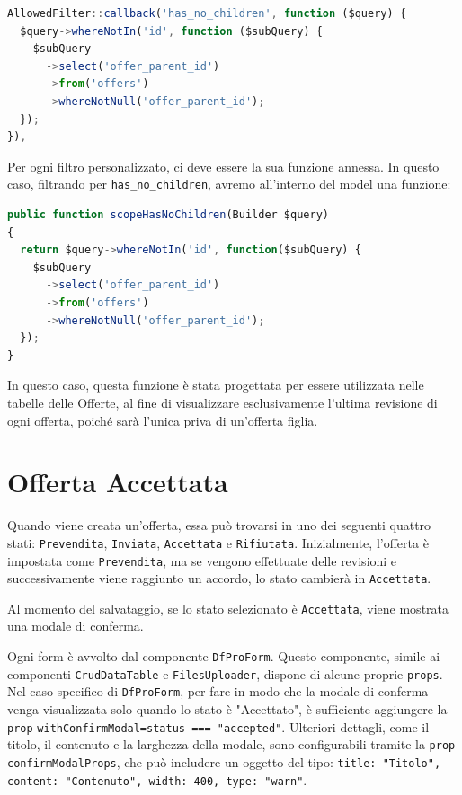 \begin{lstlisting}[language=JavaScript, numbers=none]
AllowedFilter::callback('has_no_children', function ($query) {
  $query->whereNotIn('id', function ($subQuery) {
    $subQuery
      ->select('offer_parent_id')
      ->from('offers')
      ->whereNotNull('offer_parent_id');
  });
}),
\end{lstlisting}

Per ogni filtro personalizzato, ci deve essere la sua funzione annessa. In questo caso, filtrando per \texttt{has\_no\_children}, avremo all'interno del model una funzione:

\begin{lstlisting}[language=JavaScript, numbers=none]
public function scopeHasNoChildren(Builder $query)
{
  return $query->whereNotIn('id', function($subQuery) {
    $subQuery
      ->select('offer_parent_id')
      ->from('offers')
      ->whereNotNull('offer_parent_id');
  });
}
\end{lstlisting}

In questo caso, questa funzione è stata progettata per essere utilizzata nelle tabelle delle Offerte, al fine di visualizzare esclusivamente l'ultima revisione di ogni offerta, poiché sarà l'unica priva di un'offerta figlia.

\section{Offerta Accettata}\label{sec:cap_sec_subsec_accepted_offer}
Quando viene creata un'offerta, essa può trovarsi in uno dei seguenti quattro stati: \texttt{Prevendita}, \texttt{Inviata}, \texttt{Accettata} e \texttt{Rifiutata}. Inizialmente, l'offerta è impostata come \texttt{Prevendita}, ma se vengono effettuate delle revisioni e successivamente viene raggiunto un accordo, lo stato cambierà in \texttt{Accettata}. 

Al momento del salvataggio, se lo stato selezionato è \texttt{Accettata}, viene mostrata una modale di conferma.

Ogni form è avvolto dal componente \texttt{DfProForm}. Questo componente, simile ai componenti \texttt{CrudDataTable} e \texttt{FilesUploader}, dispone di alcune proprie \texttt{props}. Nel caso specifico di \texttt{DfProForm}, per fare in modo che la modale di conferma venga visualizzata solo quando lo stato è "Accettato", è sufficiente aggiungere la \texttt{prop} \texttt{withConfirmModal={status === "accepted"}}. Ulteriori dettagli, come il titolo, il contenuto e la larghezza della modale, sono configurabili tramite la \texttt{prop} \texttt{confirmModalProps}, che può includere un oggetto del tipo: \texttt{{title: "Titolo", content: "Contenuto", width: 400, type: "warn"}}.

